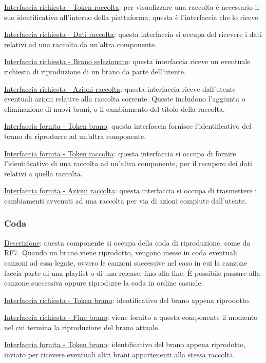 \documentclass[a4paper,12pt]{article}
\begin{document}
\underline{Interfaccia richiesta - Token raccolta}: per visualizzare una raccolta è necessario il suo identificativo all’interno della piattaforma; questa è l’interfaccia che lo riceve.

\underline{Interfaccia richiesta - Dati raccolta}: questa interfaccia si occupa del ricevere i dati relativi ad una raccolta da un’altra componente.

\underline{Interfaccia richiesta - Brano selezionato}: questa interfaccia riceve un eventuale richiesta di riproduzione di un brano da parte dell’utente.

\underline{Interfaccia richiesta - Azioni raccolta}: questa interfaccia riceve dall’utente eventuali azioni relative alla raccolta corrente. Queste includono l’aggiunta o eliminazione di nuovi brani, o il cambiamento del titolo della raccolta.

\underline{Interfaccia fornita - Token brano}: questa interfaccia fornisce l’identificativo del brano da riprodurre ad un’altra componente.

\underline{Interfaccia fornita - Token raccolta}: questa interfaccia si occupa di fornire l’identificativo di una raccolta ad un’altra componente, per il recupero dei dati relativi a quella raccolta.

\underline{Interfaccia fornita - Azioni raccolta}: questa interfaccia si occupa di trasmettere i cambiamenti avvenuti ad una raccolta per via di azioni compiute dall’utente.

\subsubsection{Coda}

\underline{Descrizione}: questa componente si occupa della coda di riproduzione, come da RF7. Quando un brano viene riprodotto, vengono messe in coda eventuali canzoni ad essa legate, ovvero le canzoni successive nel caso in cui la canzone faccia parte di una playlist o di una release, fino alla fine. È possibile passare alla canzone successiva oppure riprodurre la coda in ordine casuale.

\underline{Interfaccia richiesta - Token brano}: identificativo del brano appena riprodotto.

\underline{Interfaccia richiesta - Fine brano}: viene fornito a questa componente il momento nel cui termina la riproduzione del brano attuale.

\underline{Interfaccia fornita - Token brano}: identificativo del brano appena riprodotto, inviato per ricevere eventuali altri brani appartenenti alla stessa raccolta.
\end{document}
